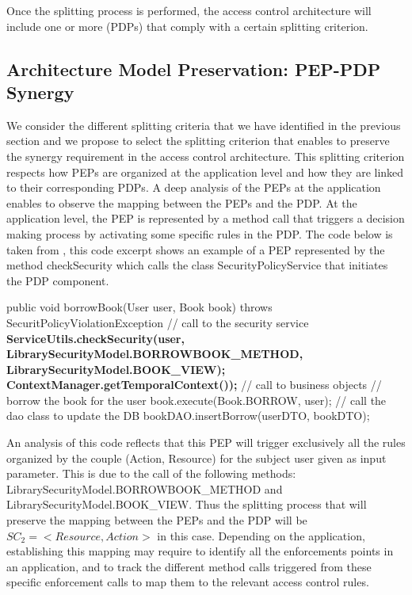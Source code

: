Once the splitting process is performed, the access control architecture will include one or more (PDPs) that comply with a certain splitting criterion.
 
\subsection{Architecture Model Preservation: PEP-PDP Synergy}
We consider the different splitting criteria that we have identified in the previous section and we propose to select the splitting 
criterion that enables to preserve the synergy requirement in the access control architecture. This splitting criterion respects how PEPs are organized 
at the application level and how they are linked to their corresponding PDPs.
A deep analysis of the PEPs at the application enables to observe the mapping between the PEPs and the PDP. At the application level, the PEP
is represented by a method call that triggers a decision making process by activating some specific rules in the PDP.
The code below is taken from \cite{legacy}, this code excerpt shows an example of a PEP represented by the method 
checkSecurity which calls the class SecurityPolicyService that initiates the PDP component.
\begin{algorithmic}
\begin{algorithm}[!h]
   \STATE public void borrowBook(User user, Book book)
   \STATE throws SecuritPolicyViolationException {
   \STATE   // call to the security service
\STATE \hspace{0.5cm} \textbf{ServiceUtils.checkSecurity(user,
\STATE LibrarySecurityModel.BORROWBOOK\_METHOD,
\STATE LibrarySecurityModel.BOOK\_VIEW);
\STATE ContextManager.getTemporalContext());}
    \STATE  // call to business objects
    \STATE  // borrow the book for the user
\STATE \hspace{0.5cm} book.execute(Book.BORROW, user);
\STATE      // call the dao class to update the DB
\STATE \hspace{0.5cm} bookDAO.insertBorrow(userDTO, bookDTO);}
\end{algorithm}
\end{algorithmic}

An analysis of this code reflects that this PEP will trigger exclusively all the rules organized by the couple (Action, Resource) for 
the subject user given as input parameter. This is due to the call of the following methods: LibrarySecurityModel.BORROWBOOK\_METHOD and 
LibrarySecurityModel.BOOK\_VIEW.
Thus the splitting process that will preserve the mapping between the PEPs and the PDP will be $SC_{2}=<Resource,Action>$ in this case.
Depending on the application, establishing this mapping may require to identify all the enforcements points in an application, and to 
track the different method calls triggered from these specific enforcement calls to map them to the relevant access control rules.


